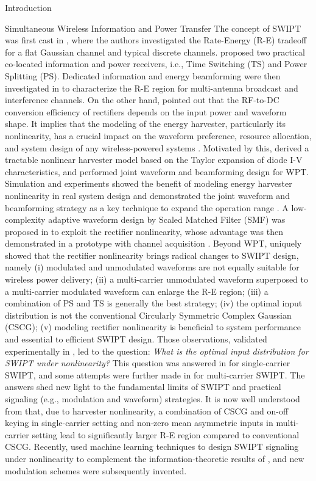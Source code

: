\documentclass[journal]{IEEEtran}
\begin{document}
\begin{section}{Introduction}
\begin{subsection}{Simultaneous Wireless Information and Power Transfer}
            The concept of SWIPT was first cast in \cite{Varshney2008}, where the authors investigated the Rate-Energy (R-E) tradeoff for a flat Gaussian channel and typical discrete channels. \cite{Zhou2013} proposed two practical co-located information and power receivers, i.e., Time Switching (TS) and Power Splitting (PS). Dedicated information and energy beamforming were then investigated in \cite{Zhang2013,Park2014} to characterize the R-E region for multi-antenna broadcast and interference channels. On the other hand, \cite{Trotter2009} pointed out that the RF-to-DC conversion efficiency of rectifiers depends on the input power and waveform shape. It implies that the modeling of the energy harvester, particularly its nonlinearity, has a crucial impact on the waveform preference, resource allocation, and system design of any wireless-powered systems \cite{Trotter2009,Clerckx2018,Clerckx2019}. Motivated by this, \cite{Clerckx2016a} derived a tractable nonlinear harvester model based on the Taylor expansion of diode I-V characteristics, and performed joint waveform and beamforming design for WPT. Simulation and experiments showed the benefit of modeling energy harvester nonlinearity in real system design \cite{Kim2019,Kim2020a} and demonstrated the joint waveform and beamforming strategy as a key technique to expand the operation range \cite{Kim2021}. A low-complexity adaptive waveform design by Scaled Matched Filter (SMF) was proposed in \cite{Clerckx2017} to exploit the rectifier nonlinearity, whose advantage was then demonstrated in a prototype with channel acquisition \cite{Kim2017}. Beyond WPT, \cite{Clerckx2018b} uniquely showed that the rectifier nonlinearity brings radical changes to SWIPT design, namely (i) modulated and unmodulated waveforms are not equally suitable for wireless power delivery; (ii) a multi-carrier unmodulated waveform superposed to a multi-carrier modulated waveform can enlarge the R-E region; (iii) a combination of PS and TS is generally the best strategy; (iv) the optimal input distribution is not the conventional Circularly Symmetric Complex Gaussian (CSCG); (v) modeling rectifier nonlinearity is beneficial to system performance and essential to efficient SWIPT design. Those observations, validated experimentally in \cite{Kim2019}, led to the question: \emph{What is the optimal input distribution for SWIPT under nonlinearity?} This question was answered in \cite{Varasteh2020} for single-carrier SWIPT, and some attempts were further made in \cite{Varasteh2019d} for multi-carrier SWIPT. The answers shed new light to the fundamental limits of SWIPT and practical signaling (e.g., modulation and waveform) strategies. It is now well understood from \cite{Clerckx2018b,Varasteh2020,Varasteh2019d} that, due to harvester nonlinearity, a combination of CSCG and on-off keying in single-carrier setting and non-zero mean asymmetric inputs in multi-carrier setting lead to significantly larger R-E region compared to conventional CSCG. Recently, \cite{Varasteh2020a} used machine learning techniques to design SWIPT signaling under nonlinearity to complement the information-theoretic results of \cite{Varasteh2020}, and new modulation schemes were subsequently invented.

\end{subsection}
\end{section}
\end{document}
